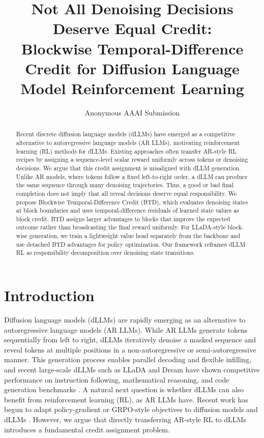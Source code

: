 \documentclass[letterpaper]{article}
\title{Not All Denoising Decisions Deserve Equal Credit:\\
Blockwise Temporal-Difference Credit for Diffusion Language Model Reinforcement Learning}
\author{Anonymous AAAI Submission}
\begin{document}
\maketitle

\begin{abstract}
Recent discrete diffusion language models (dLLMs) have emerged as a competitive alternative to autoregressive language models (AR LLMs), motivating reinforcement learning (RL) methods for dLLMs. Existing approaches often transfer AR-style RL recipes by assigning a sequence-level scalar reward uniformly across tokens or denoising decisions. We argue that this credit assignment is misaligned with dLLM generation. Unlike AR models, where tokens follow a fixed left-to-right order, a dLLM can produce the same sequence through many denoising trajectories. Thus, a good or bad final completion does not imply that all reveal decisions deserve equal responsibility. We propose Blockwise Temporal-Difference Credit (BTD), which evaluates denoising states at block boundaries and uses temporal-difference residuals of learned state values as block credit. BTD assigns larger advantages to blocks that improve the expected outcome rather than broadcasting the final reward uniformly. For LLaDA-style block-wise generation, we train a lightweight value head separately from the backbone and use detached BTD advantages for policy optimization. Our framework reframes dLLM RL as responsibility decomposition over denoising state transitions.
\end{abstract}

\section{Introduction}

Diffusion language models (dLLMs) are rapidly emerging as an alternative to autoregressive language models (AR LLMs). While AR LLMs generate tokens sequentially from left to right, dLLMs iteratively denoise a masked sequence and reveal tokens at multiple positions in a non-autoregressive or semi-autoregressive manner. This generation process enables parallel decoding and flexible infilling, and recent large-scale dLLMs such as LLaDA and Dream have shown competitive performance on instruction following, mathematical reasoning, and code generation benchmarks \cite{nie2025llada,ye2025dream}. A natural next question is whether dLLMs can also benefit from reinforcement learning (RL), as AR LLMs have. Recent work has begun to adapt policy-gradient or GRPO-style objectives to diffusion models and dLLMs \cite{black2023ddpo,zhao2025d1}. However, we argue that directly transferring AR-style RL to dLLMs introduces a fundamental credit assignment problem.
\end{document}
